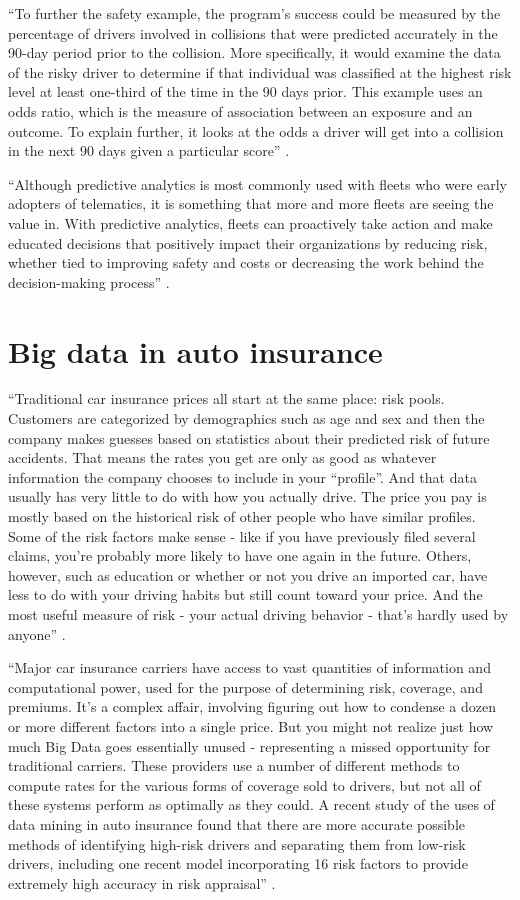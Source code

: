 ``To further the safety example, the program’s success could be measured by the percentage of drivers involved in collisions that were predicted accurately in the 90-day period prior to the collision. More specifically, it would examine the data of the risky driver to determine if that individual was classified at the highest risk level at least one-third of the time in the 90 days prior. This example uses an odds ratio, which is the measure of association between an exposure and an outcome. To explain further, it looks at the odds a driver will get into a collision in the next 90 days given a particular score'' \cite{Suizo2015decisions}.

``Although predictive analytics is most commonly used with fleets who were early adopters of telematics, it is something that more and more fleets are seeing the value in. With predictive analytics, fleets can proactively take action and make educated decisions that positively impact their organizations by reducing risk, whether tied to improving safety and costs or decreasing the work behind the decision-making process'' \cite{Suizo2015decisions}.

\section{Big data in auto insurance}

``Traditional car insurance prices all start at the same place: risk pools. Customers are categorized by demographics such as age and sex and then the company makes guesses based on statistics about their predicted risk of future accidents. That means the rates you get are only as good as whatever information the company chooses to include in your “profile”. And that data usually has very little to do with how you actually drive. The price you pay is mostly based on the historical risk of other people who have similar profiles. Some of the risk factors make sense - like if you have previously filed several claims, you’re probably more likely to have one again in the future. Others, however, such as education or whether or not you drive an imported car, have less to do with your driving habits but still count toward your price. And the most useful measure of risk - your actual driving behavior - that’s hardly used by anyone'' \cite{Rippe2017unfair}.

``Major car insurance carriers have access to vast quantities of information and computational power, used for the purpose of determining risk, coverage, and premiums. It’s a complex affair, involving figuring out how to condense a dozen or more different factors into a single price. But you might not realize just how much Big Data goes essentially unused - representing a missed opportunity for traditional carriers. These providers use a number of different methods to compute rates for the various forms of coverage sold to drivers, but not all of these systems perform as optimally as they could. A recent study of the uses of data mining in auto insurance found that there are more accurate possible methods of identifying high-risk drivers and separating them from low-risk drivers, including one recent model incorporating 16 risk factors to provide extremely high accuracy in risk appraisal'' \cite{Rippe2017unfair}.

